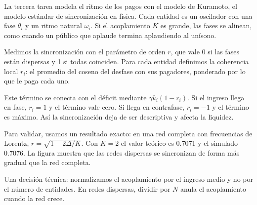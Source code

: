 \begin{preguntas}
\end{preguntas}

\begin{decir}
La tercera tarea modela el ritmo de los pagos con el modelo de Kuramoto, el modelo
estándar de sincronización en física. Cada entidad es un oscilador con una fase
$\theta_i$ y un ritmo natural $\omega_i$. Si el acoplamiento $K$ es grande, las fases se
alinean, como cuando un público que aplaude termina aplaudiendo al unísono.

Medimos la sincronización con el parámetro de orden $r$, que vale 0 si las fases están
dispersas y 1 si todas coinciden. Para cada entidad definimos la coherencia local
$r_i$: el promedio del coseno del desfase con sus pagadores, ponderado por lo que le paga
cada uno.

Este término se conecta con el déficit mediante $\gamma k_i(1-r_i)$. Si el ingreso
llega en fase, $r_i=1$ y el término vale cero. Si llega en contrafase, $r_i=-1$ y el
término es máximo. Así la sincronización deja de ser descriptiva y afecta la liquidez.

Para validar, usamos un resultado exacto: en una red completa con frecuencias de
Lorentz, $r=\sqrt{1-2\Delta/K}$. Con $K=2$ el valor teórico es 0.7071 y el simulado
0.7076. La figura muestra que las redes dispersas se sincronizan de forma más gradual
que la red completa.

Una decisión técnica: normalizamos el acoplamiento por el ingreso medio y no por el
número de entidades. En redes dispersas, dividir por $N$ anula el acoplamiento cuando la
red crece.
\end{decir}
